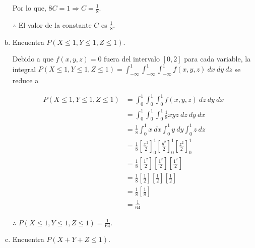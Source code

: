 \documentclass[12pt]{exam}
\begin{document}
\begin{questions}
\begin{enumerate}[(a)]
    Por lo que, $8C = 1 \Rightarrow C = \frac{1}{8}$.

    $\therefore$ El valor de la constante $C$ es $\frac{1}{8}$.

  \item Encuentra $P (X \leq 1, Y \leq 1, Z \leq 1)$.

    Debido a que $f(x,y,z) = 0$ fuera del intervalo $[0,2]$ para cada variable, la integral $P (X \leq 1, Y \leq 1, Z \leq 1) = \int_{-\infty}^1 \int_{-\infty}^1 \int_{-\infty}^1 f(x,y,z) ~ dx ~ dy ~ dz$ se reduce a

    \begin{align*}
      P (X \leq 1, Y \leq 1, Z \leq 1)
      &= \int_0^1 \int_0^1 \int_0^1 f(x,y,z) ~ dz ~ dy ~ dx \\
      &= \int_0^1 \int_0^1 \int_0^1 \frac{1}{8}xyz ~ dz ~ dy ~ dx \\
      &= \frac{1}{8} \int_0^1 x ~ dx \int_0^1 y ~ dy \int_0^1 z ~ dz \\
      &= \frac{1}{8} \left[ \frac{x^2}{2} \right]_0^1 \left[ \frac{y^2}{2} \right]_0^1 \left[ \frac{z^2}{2} \right]_0^1 \\
      &= \frac{1}{8} \left[ \frac{1^2}{2} \right] \left[ \frac{1^2}{2} \right] \left[ \frac{1^2}{2} \right] \\
      &= \frac{1}{8} \left[ \frac{1}{2} \right] \left[ \frac{1}{2} \right] \left[ \frac{1}{2} \right] \\
      &= \frac{1}{8} \left[ \frac{1}{8} \right] \\
      &= \frac{1}{64}
    \end{align*}

    $\therefore$ $P (X \leq 1, Y \leq 1, Z \leq 1) = \frac{1}{64}$.

  \item Encuentra $P (X + Y + Z \leq 1)$.

    \begin{figure}[H]
      \centering
\end{figure}
\end{enumerate}
\end{questions}
\end{document}
